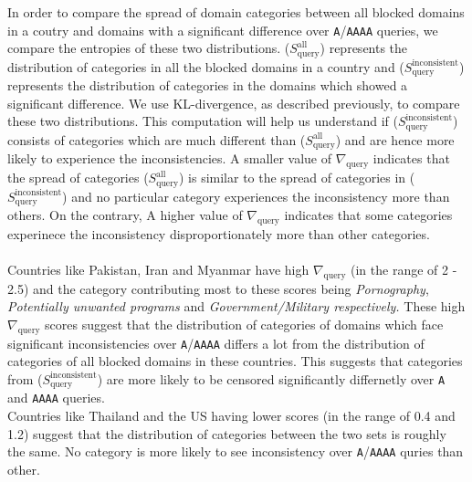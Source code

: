 In order to compare the spread of domain categories between all blocked domains in a coutry
and domains with a significant difference over {\tt A}/{\tt AAAA} queries, we compare the 
entropies of these two distributions. ($S^{\text{all}}_{\text{query}}$) represents
the distribution of categories in all the blocked domains in a country and 
($S^{\text{inconsistent}}_{\text{query}}$) represents the distribution of categories in the 
domains which showed a significant difference. We use KL-divergence, as described previously,
to compare these two distributions. This computation will help us understand if 
($S^{\text{inconsistent}}_{\text{query}}$) consists of categories which are much different
than ($S^{\text{all}}_{\text{query}}$) and are hence more likely to experience 
the inconsistencies. A smaller value of $\nabla_{\text{query}}$ indicates that the spread 
of categories ($S^{\text{all}}_{\text{query}}$) is similar to the spread of categories in 
($S^{\text{inconsistent}}_{\text{query}}$) and no particular category experiences the 
inconsistency more than others. On the contrary, A higher value of $\nabla_{\text{query}}$ 
indicates that some categories experinece the inconsistency disproportionately more than
other categories. 
\\
\\
Countries like Pakistan, Iran and Myanmar have high $\nabla_{\text{query}}$ (in the range of 
2 - 2.5) and the category contributing most to these scores being \textit{Pornography}, 
\textit{Potentially unwanted programs} and \textit{Government/Military respectively.}
These high $\nabla_{\text{query}}$ scores suggest that the distribution of categories of
domains which face significant inconsistencies over {\tt A}/{\tt AAAA} differs a lot from
the distribution of categories of all blocked domains in these countries. This suggests
that categories from ($S^{\text{inconsistent}}_{\text{query}}$) are more likely to 
be censored significantly differnetly over {\tt A} and {\tt AAAA} queries.
\\
Countries like Thailand and the US having lower scores (in the range of 0.4 and 1.2) 
suggest that the distribution of categories between the two sets is roughly the same. 
No category is more likely to see inconsistency over {\tt A}/{\tt AAAA} quries than other.  

